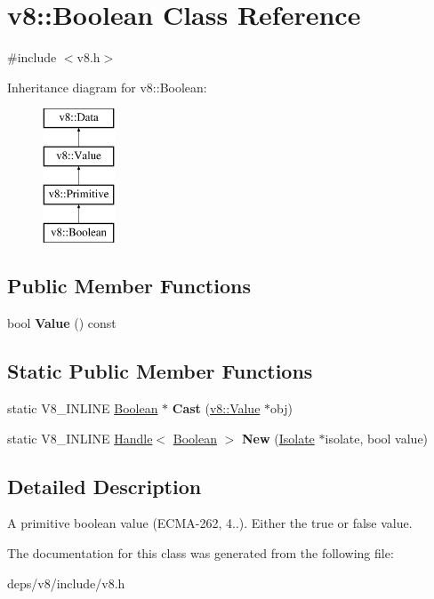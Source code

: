 \hypertarget{classv8_1_1_boolean}{}\section{v8\+:\+:Boolean Class Reference}
\label{classv8_1_1_boolean}


{\ttfamily \#include $<$v8.\+h$>$}

Inheritance diagram for v8\+:\+:Boolean\+:\begin{figure}[H]
\begin{center}
\leavevmode
\includegraphics[height=4.000000cm]{classv8_1_1_boolean}
\end{center}
\end{figure}
\subsection*{Public Member Functions}
\begin{DoxyCompactItemize}
\item 
\hypertarget{classv8_1_1_boolean_aa493d54eb43afc64ab796e1cf66ff910}{}bool {\bfseries Value} () const \label{classv8_1_1_boolean_aa493d54eb43afc64ab796e1cf66ff910}

\end{DoxyCompactItemize}
\subsection*{Static Public Member Functions}
\begin{DoxyCompactItemize}
\item 
\hypertarget{classv8_1_1_boolean_a92493565c4b9400825a0ff09780d7ff4}{}static V8\+\_\+\+I\+N\+L\+I\+N\+E \hyperlink{classv8_1_1_boolean}{Boolean} $\ast$ {\bfseries Cast} (\hyperlink{classv8_1_1_value}{v8\+::\+Value} $\ast$obj)\label{classv8_1_1_boolean_a92493565c4b9400825a0ff09780d7ff4}

\item 
\hypertarget{classv8_1_1_boolean_a936637bda9841b5150d5bce6181ef808}{}static V8\+\_\+\+I\+N\+L\+I\+N\+E \hyperlink{classv8_1_1_local}{Handle}$<$ \hyperlink{classv8_1_1_boolean}{Boolean} $>$ {\bfseries New} (\hyperlink{classv8_1_1_isolate}{Isolate} $\ast$isolate, bool value)\label{classv8_1_1_boolean_a936637bda9841b5150d5bce6181ef808}

\end{DoxyCompactItemize}


\subsection{Detailed Description}
A primitive boolean value (E\+C\+M\+A-\/262, 4..). Either the true or false value. 

The documentation for this class was generated from the following file\+:\begin{DoxyCompactItemize}
\item 
deps/v8/include/v8.\+h\end{DoxyCompactItemize}
